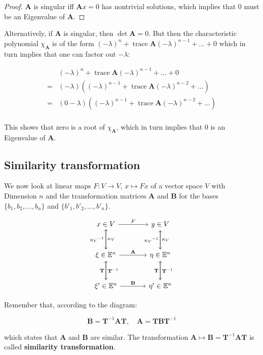 \documentclass[a4paper,12pt]{article}
\newcommand{\E}{\mathbb{E}}
\newcommand{\A}{\mat{A}}
\newcommand{\B}{\mat{B}}
\newcommand{\trace}{\operatorname{trace}}
\newcommand{\charp}[1]{\chi_{#1}}
\newcommand{\mat}[1]{\mathbf{#1}}
\newcommand{\inv}[1]{{#1}^{-1}}
\let\oldxi\xi
\renewcommand{\xi}{\mathbf{\oldxi}}
\let\oldeta\eta
\renewcommand{\eta}{\mathbf{\oldeta}}
\theoremstyle{plain}
\numberwithin{equation}{section}
\begin{document}
\begin{proof}
    $\A$ is singular iff $\A x = 0$ has nontrivial solutions, which implies that
    $0$ must be an Eigenvalue of $\A$.
\end{proof}

Alternatively, if $\A$ is singular, then $\det \A = 0$. But then the characteristic
polynomial $\charp{\A}$ is of the form $(-\lambda)^{n} + \trace \A (-\lambda)^{n - 1} + \dots + 0$
which in turn implies that one can factor out $-\lambda$:

\begin{align*}
     & (-\lambda)^{n} + \trace \A (-\lambda)^{n - 1} + \dots + 0 \\
    =& (-\lambda) ((-\lambda)^{n-1} + \trace \A (-\lambda)^{n-2} + \dots) \\
    =& (0 - \lambda) ((-\lambda)^{n-1} + \trace \A (-\lambda)^{n-2} + \dots) \\
\end{align*}

This shows that zero is a root of $\charp{\A}$, which in turn implies that 0 is an
Eigenvalue of $\A$.

\subsection{Similarity transformation}

We now look at linear maps $F \colon V \rightarrow V$, $x \mapsto F x$ of a vector
space $V$ with Dimension $n$ and the transformation matrices $\A$ and $\B$ for the
bases $\{b_1, b_2, \dots, b_n\}$ and $\{b'_1, b'_2, \dots ,b'_n\}$.

\[
    \begin{tikzcd}[row sep=large, column sep=large]
    x \in V \arrow{r}{F} \arrow{d}{\kappa_V} & y \in V \arrow{d}{\kappa_V} \\
    \xi \in \E^n \arrow{r}{\A} \arrow{u}{\inv{\kappa_V}} \arrow{d}{\inv{\mat{T}}} & \eta \in \E^n \arrow{u}{\inv{\kappa_V}} \arrow{d}{\inv{\mat{T}}} \\
    \xi' \in \E^n \arrow{r}{\B} \arrow{u}{\mat{T}} & \eta' \in \E^n \arrow{u}{\mat{T}}
\end{tikzcd}
\]

Remember that, according to the diagram:

\begin{equation}
    \B = \inv{\mat{T}} \A \mat{T}, \quad \A = \mat{T} \B \inv{\mat{T}}
\end{equation}

which states that $\A$ and $\B$ are similar. The transformation
$\A \mapsto \B = \inv{\mat{T}} \A \mat{T}$ is called \textbf{similarity transformation}.
\end{document}
